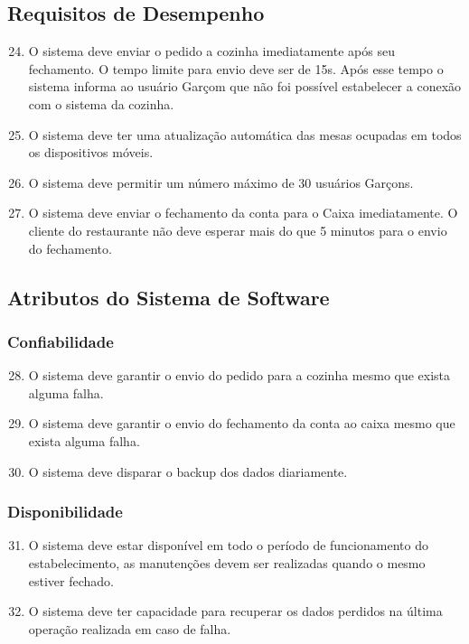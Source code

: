 \documentclass[11pt,a4paper]{article}
\begin{document}
\subsection{Requisitos de Desempenho}

\begin{enumerate}
\setcounter{enumi}{23}
    \item O sistema deve enviar o pedido a cozinha imediatamente após seu fechamento. O tempo limite para envio deve ser de 15s. Após esse tempo o sistema informa ao usuário Garçom que não foi possível estabelecer a conexão com o sistema da cozinha.
    \item O sistema deve ter uma atualização automática das mesas ocupadas em todos os dispositivos móveis.
    \item O sistema deve permitir um número máximo de 30 usuários Garçons.
    \item O sistema deve enviar o fechamento da conta para o Caixa imediatamente. O cliente do restaurante não deve esperar mais do que 5 minutos para o envio do fechamento.
\end{enumerate}

\subsection{Atributos do Sistema de Software}

\subsubsection{Confiabilidade}

\begin{enumerate}
\setcounter{enumi}{27}
    \item O sistema deve garantir o envio do pedido para a cozinha mesmo que exista alguma falha.
    \item O sistema deve garantir o envio do fechamento da conta ao caixa mesmo que exista alguma falha.
    \item O sistema deve disparar o backup dos dados diariamente.
\end{enumerate}

\subsubsection{Disponibilidade}

\begin{enumerate}
\setcounter{enumi}{30}
    \item O sistema deve estar disponível em todo o período de funcionamento do estabelecimento, as manutenções devem ser realizadas quando o mesmo estiver fechado.
    \item O sistema deve ter capacidade para recuperar os dados perdidos na última operação realizada em caso de falha.
\end{enumerate}
\end{document}
